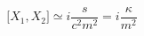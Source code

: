\begin{equation}
     \big[X_{1},X_{2}]\simeq i\frac{s}{c^2m^2}=i\frac{\kappa}{m^2}
\end{equation}

